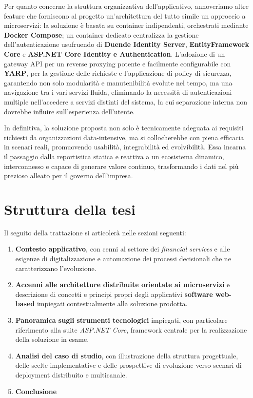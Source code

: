 Per quanto concerne la struttura organizzativa dell'applicativo, annoveriamo altre feature che forniscono al progetto un'architettura del tutto simile un approccio a microservizi: la soluzione è basata su container indipendenti, orchestrati mediante \textbf{Docker Compose}; un container dedicato centralizza la gestione dell'autenticazione usufruendo di \textbf{Duende Identity Server}, \textbf{EntityFramework Core} e \textbf{ASP.NET Core Identity e Authentication}. L'adozione di un gateway API per un reverse proxying potente e facilmente configurabile con \textbf{YARP}, per la gestione delle richieste e l'applicazione di policy di sicurezza, garantendo non solo modularità e manutenibilità evolute nel tempo, ma una navigazione tra i vari servizi fluida, eliminando la necessità di autenticazioni multiple nell'accedere a servizi distinti del sistema, la cui separazione interna non dovrebbe influire sull'esperienza dell'utente.

In definitiva, la soluzione proposta non solo è tecnicamente adeguata ai requisiti richiesti da organizzazioni data-intensive, ma si collocherebbe con piena efficacia in scenari reali, promuovendo usabilità, integrabilità ed evolvibilità. Essa incarna il passaggio dalla reportistica statica e reattiva a un ecosistema dinamico, interconnesso e capace di generare valore continuo, trasformando i dati nel più prezioso alleato per il governo dell’impresa.

\section{Struttura della tesi}
Il seguito della trattazione si articolerà nelle sezioni seguenti:

\begin{enumerate}
	\item \textbf{Contesto applicativo}, con cenni al settore dei \emph{financial services} e alle esigenze di digitalizzazione e automazione dei processi decisionali che ne caratterizzano l'evoluzione.
	\item \textbf{Accenni alle architetture distribuite orientate ai microservizi} e descrizione di concetti e principi propri degli applicativi \textbf{software web-based} impiegati contestualmente alla soluzione prodotta.
	\item \textbf{Panoramica sugli strumenti tecnologici} impiegati, con particolare riferimento alla suite \emph{ASP.NET Core}, framework centrale per la realizzazione della soluzione in esame.
	\item \textbf{Analisi del caso di studio}, con illustrazione della struttura progettuale, delle scelte implementative e delle prospettive di evoluzione verso scenari di deployment distribuito e multicanale.
	\item \textbf{Conclusione}
\end{enumerate}

